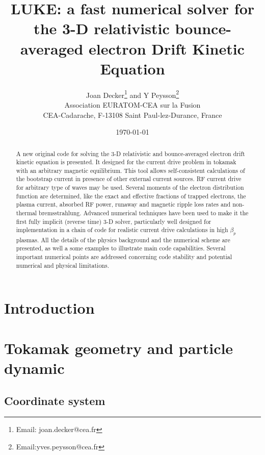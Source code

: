 \documentclass[11pt,a4paper]{report}
\begin{document}
\title{LUKE: a fast numerical solver for the 3-D relativistic
bounce-averaged electron Drift Kinetic Equation}
\author{Joan Decker\thanks{Email: joan.decker@cea.fr} and Y Peysson\thanks{Email:yves.peysson@cea.fr} \\
Association EURATOM-CEA sur la Fusion\\
CEA-Cadarache, F-13108 Saint Paul-lez-Durance, France}
\date{\today}
\maketitle

\begin{abstract}
A new original code for solving the 3-D relativistic and bounce-averaged
electron drift kinetic equation is presented. It designed for the current
drive problem in tokamak with an arbitrary magnetic equilibrium. This tool
allows self-consistent calculations of the bootstrap current in presence of
other external current sources. RF current drive for arbitrary type of waves
may be used. Several moments of the electron distribution function are
determined, like the exact and effective fractions of trapped electrons, the
plasma current, absorbed RF power, runaway and magnetic ripple loss rates
and non-thermal bremsstrahlung. Advanced numerical techniques have been used
to make it the first fully implicit (reverse time) 3-D solver, particularly
well designed for implementation in a chain of code for realistic current
drive calculations in high $\beta _{p}$ plasmas. All the details of the
physics background and the numerical scheme are presented, as well a some
examples to illustrate main code capabilities. Several important numerical
points are addressed concerning code stability and potential numerical and
physical limitations.
\end{abstract}

\tableofcontents
\listoffigures
\listoftables

\chapter{Introduction}



\chapter{Tokamak geometry and particle dynamic}

	\section{Coordinate system}
	
\end{document}
